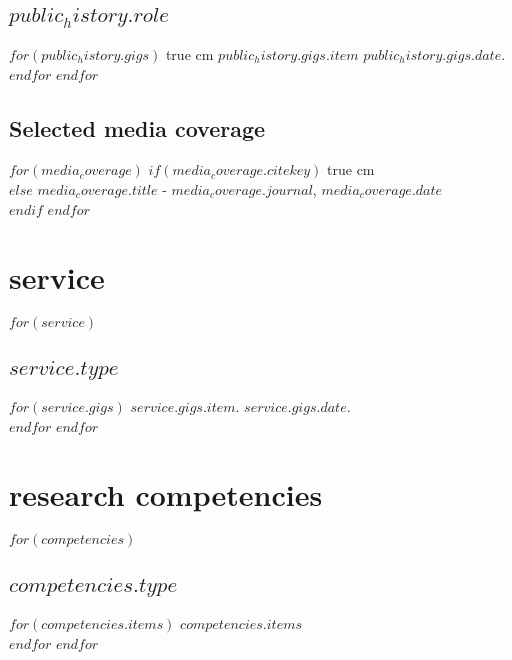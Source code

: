 \documentclass[11pt, letter]{article}
\def\ind{\hangindent=1 true cm\hangafter=1 \noindent}
\begin{document}
\subsection{$public_history.role$}
$for(public_history.gigs)$
\ind $public_history.gigs.item$ $public_history.gigs.date$.\\[.15cm]
$endfor$
$endfor$
\subsection{Selected media coverage}

$for(media_coverage)$
$if(media_coverage.citekey)$
\ind {}\\
$else$
$media_coverage.title$ -  \textit{$media_coverage.journal$}, $media_coverage.date$\\[.15cm]
$endif$
$endfor$


\section{service}
$for(service)$
\subsection{$service.type$}
$for(service.gigs)$
$service.gigs.item$. $service.gigs.date$.\\[.15cm]
$endfor$
$endfor$


\section{research competencies}
$for(competencies)$
\subsection{\itshape $competencies.type$}
$for(competencies.items)$
$competencies.items$\\[.15cm]
$endfor$
$endfor$
\end{document}
